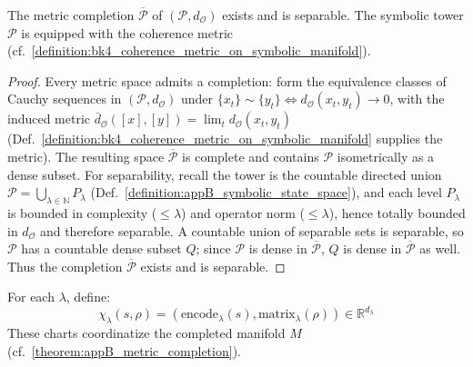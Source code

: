 \begin{theorem}
\label{theorem:appB_metric_completion}
The metric completion $\overline{\mathcal{P}}$ of $(\mathcal{P}, d_{\mathcal{O}})$ exists and is separable.
The symbolic tower $\mathcal{P}$ is equipped with the coherence metric (cf.~\ref{definition:bk4_coherence_metric_on_symbolic_manifold}).
\end{theorem}
\begin{proof}
\label{proof:appB_metric_completion}
\leavevmode
Every metric space admits a completion: form the equivalence classes of Cauchy sequences in $(\mathcal{P},d_{\mathcal{O}})$ under $\{x_t\}\sim\{y_t\}\Leftrightarrow d_{\mathcal{O}}(x_t,y_t)\to 0$, with the induced metric $\bar d_{\mathcal{O}}([x],[y])=\lim_t d_{\mathcal{O}}(x_t,y_t)$ (Def.~\ref{definition:bk4_coherence_metric_on_symbolic_manifold} supplies the metric). The resulting space $\overline{\mathcal{P}}$ is complete and contains $\mathcal{P}$ isometrically as a dense subset. For separability, recall the tower is the countable directed union $\mathcal{P}=\bigcup_{\lambda\in\mathbb{N}}P_\lambda$ (Def.~\ref{definition:appB_symbolic_state_space}), and each level $P_\lambda$ is bounded in complexity ($\le\lambda$) and operator norm ($\le\lambda$), hence totally bounded in $d_{\mathcal{O}}$ and therefore separable. A countable union of separable sets is separable, so $\mathcal{P}$ has a countable dense subset $Q$; since $\mathcal{P}$ is dense in $\overline{\mathcal{P}}$, $Q$ is dense in $\overline{\mathcal{P}}$ as well. Thus the completion $\overline{\mathcal{P}}$ exists and is separable.
\end{proof}

\begin{definition}
\label{definition:appB_symbolic_chart}
For each $\lambda$, define:
\[
\chi_\lambda(s, \rho) = (\text{encode}_\lambda(s), \text{matrix}_\lambda(\rho)) \in \mathbb{R}^{d_\lambda}
\]
These charts coordinatize the completed manifold $M$ (cf.~\ref{theorem:appB_metric_completion}).
\end{definition}

